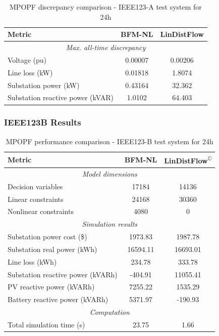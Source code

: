 \begin{table}[H]
    \centering
    \caption{MPOPF discrepancy comparison - IEEE123-A test system for 24h}
    \label{table:mpopf-tradeoffs-feas-ieee123a}
    \begin{tabular}{|l|c|c|}
    \hline
    \textbf{Metric} & \textbf{BFM-NL} & \textbf{LinDistFlow} \\ \hline
    \multicolumn{3}{|c|}{\textit{Max. all-time discrepancy}} \\ \hline
    Voltage (pu) & 0.00007 & 0.00206 \\ \hline
    Line loss (kW) & 0.01818 & 1.8074 \\ \hline
    Substation power (kW) & 0.43164 & 32.362 \\ \hline
    Substation reactive power (kVAR) & 1.0102 & 64.403 \\ \hline
    \end{tabular}
\end{table}

\subsubsection{IEEE123B Results}

\begin{table}[H]
    \centering
    \caption{MPOPF performance comparison - IEEE123-B test system for 24h}
    \label{table:mpopf-tradeoffs-opt-ieee123b}
    \begin{tabular}{|l|c|c|}
    \hline
    \textbf{Metric} & \textbf{BFM-NL} & \textbf{LinDistFlow\textsuperscript{\(\mathbb{O}\)}} \\ \hline
    \multicolumn{3}{|c|}{\textit{Model dimensions}} \\ \hline
    Decision variables & {17184} & {14136} \\ \hline
    Linear constraints & {24168} & {30360} \\ \hline
    Nonlinear constraints & {4080} & {0} \\ \hline
    \multicolumn{3}{|c|}{\textit{Simulation results}} \\ \hline
    Substation power cost (\$) & 1973.83 & 1987.78 \\ \hline
    Substation real power (kWh) & 16594.11 & 16693.01 \\ \hline
    Line loss (kWh) & 234.78 & 333.78 \\ \hline
    Substation reactive power (kVARh) & -404.91 & 11055.41 \\ \hline
    PV reactive power (kVARh) & 7255.22 & 1535.29 \\ \hline
    Battery reactive power (kVARh) & 5371.97 & -190.93 \\ \hline
    \multicolumn{3}{|c|}{\textit{Computation}} \\ \hline
    Total simulation time (s) & 23.75 & 1.66 \\ \hline
    \end{tabular}
\end{table}

